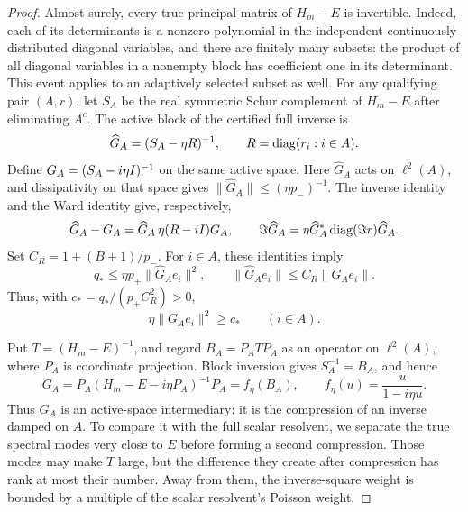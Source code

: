 \begin{proof}
Almost surely, every true principal matrix of $H_m-E$ is invertible.
Indeed, each of its determinants is a nonzero polynomial in the
independent continuously distributed diagonal variables, and there
are finitely many subsets: the product of all diagonal variables
in a nonempty block has coefficient one in its determinant.
This event applies to an adaptively selected subset as well.
For any qualifying pair $(A,r)$, let $S_A$ be the real symmetric
Schur complement of $H_m-E$ after eliminating $A^c$. The active block of the
certified full inverse is
\[
 \widehat G_A=(S_A-\eta R)^{-1},\qquad
 R=\operatorname{diag}(r_i:i\in A).
\]
Define $G_A=(S_A-i\eta I)^{-1}$ on the same active space.
Here $\widehat G_A$ acts on $\ell^2(A)$, and dissipativity on that
space gives $\|\widehat G_A\|\le(\eta p_-)^{-1}$.
The inverse identity and the Ward identity give, respectively,
\[
 \widehat G_A-G_A=\widehat G_A\,\eta(R-iI)G_A,
 \qquad
 \Im\widehat G_A=\eta\widehat G_A^*\operatorname{diag}(\Im r)\widehat G_A.
\]
Set $C_R=1+(B+1)/p_-$. For $i\in A$, these identities imply
\[
 q_*\le\eta p_+\|\widehat G_Ae_i\|^2,\qquad
 \|\widehat G_Ae_i\|\le C_R\|G_Ae_i\|.
\]
Thus, with $c_*=q_*/(p_+C_R^2)>0$,
\begin{equation}\label{eq:spectral-subset-column}
 \eta\|G_Ae_i\|^2\ge c_*\qquad(i\in A).
\end{equation}

Put $T=(H_m-E)^{-1}$, and regard $B_A=P_ATP_A$ as an operator
on $\ell^2(A)$, where $P_A$ is coordinate projection. Block
inversion gives $S_A^{-1}=B_A$, and hence
\[
 G_A=P_A(H_m-E-i\eta P_A)^{-1}P_A=f_\eta(B_A),
 \qquad f_\eta(u)=\frac{u}{1-i\eta u}.
\]
Thus $G_A$ is an active-space intermediary: it is the compression of
an inverse damped on $A$. To compare it with the full scalar resolvent,
we separate the true spectral modes very close to $E$ before forming
a second compression. Those modes may make $T$ large, but the
difference they create after compression has rank at most their number.
Away from them, the
inverse-square weight is bounded by a multiple of the scalar
resolvent's Poisson weight.


\end{proof}
